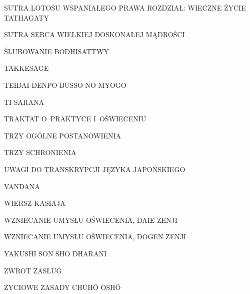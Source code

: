 \par\noindent SUTRA LOTOSU WSPANIAŁEGO PRAWA ROZDZIAŁ: WIECZNE ŻYCIE TATHAGATY \dotfill \makebox[1.0cm][r]{\pageref{sutralotosu_wieczne_zycie}}
\par\noindent SUTRA SERCA WIELKIEJ DOSKONAŁEJ MĄDROŚCI \dotfill \makebox[1.0cm][r]{\pageref{serce_doskonalej_madrosci}}
\par\noindent ŚLUBOWANIE BODHISATTWY \dotfill \makebox[1.0cm][r]{\pageref{slubowanie_bodhisattwy}}
\par\noindent TAKKESAGE \dotfill \makebox[1.0cm][r]{\pageref{tekkesage}}
\par\noindent TEIDAI DENPO BUSSO NO MYOGO \dotfill \makebox[1.0cm][r]{\pageref{teidai_denpo_busso_no_myogo}}
\par\noindent TI-SARANA \dotfill \makebox[1.0cm][r]{\pageref{ti-sarana}}
\par\noindent TRAKTAT O~PRAKTYCE I~OŚWIECENIU \dotfill \makebox[1.0cm][r]{\pageref{traktat_o_praktyce}}
\par\noindent TRZY OGÓLNE POSTANOWIENIA \dotfill \makebox[1.0cm][r]{\pageref{trzy_ogolne_postanowienia}}
\par\noindent TRZY SCHRONIENIA \dotfill \makebox[1.0cm][r]{\pageref{trzy_schronienia}}
\par\noindent UWAGI DO TRANSKRYPCJI JĘZYKA JAPOŃSKIEGO \dotfill \makebox[1.0cm][r]{\pageref{uwagi_do_transkrypcji}}
\par\noindent VANDANA \dotfill \makebox[1.0cm][r]{\pageref{vandana}}
\par\noindent WIERSZ KASIAJA \dotfill \makebox[1.0cm][r]{\pageref{wiersz_kesy}}
\par\noindent WZNIECANIE UMYSŁU OŚWIECENIA, DAIE ZENJI \dotfill \makebox[1.0cm][r]{\pageref{wzniecanie_umyslu_oswiecenia_daie}}
\par\noindent WZNIECANIE UMYSŁU OŚWIECENIA, DOGEN ZENJI \dotfill \makebox[1.0cm][r]{\pageref{wzniecanie_umyslu_oswiecenia_dogen}}
\par\noindent YAKUSHI SON SHO DHARANI \dotfill \makebox[1.0cm][r]{\pageref{yakushi_son_sho_dharani}}
\par\noindent ZWROT ZASŁUG \dotfill \makebox[1.0cm][r]{\pageref{zwrot_zaslug}}
\par\noindent ŻYCIOWE ZASADY CH\=UH\=O OSH\=O \dotfill \makebox[1.0cm][r]{\pageref{zyciowe_zasady_chuho_osho}}
